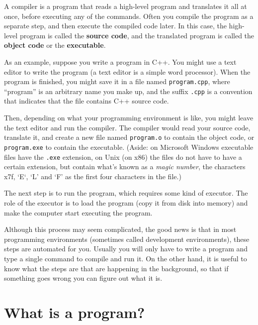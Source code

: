 \vspace{0.1in}
\centerline{}
\vspace{0.1in}

A compiler is a program that reads a high-level program and
translates it all at once, before executing any of the commands.
Often you compile the program as a separate step, and then
execute the compiled code later.  In this case, the high-level
program is called the {\bf source code}, and the translated
program is called the {\bf object code} or the {\bf executable}.

As an example, suppose you write a program in C++.  You might
use a text editor to write the program (a text editor is
a simple word processor).  When the program is finished, you
might save it in a file named {\tt program.cpp}, where ``program''
is an arbitrary name you make up, and the suffix {\tt .cpp} is
a convention that indicates that the file contains C++ source
code.

Then, depending on what your programming environment is like,
you might leave the text editor and run the compiler.  The
compiler would read your source code, translate it, and create
a new file named {\tt program.o} to contain the object code,
or {\tt program.exe} to contain the executable.  (Aside: on Microsoft Windows executable files have the {\tt .exe} extension, on Unix (on x86) the files do not have to have a certain extension, but contain what's known as a {\it magic number}, the characters \\x7f, `E`, `L' and `F' as the first four characters in the file.)  

\vspace{0.1in}
\centerline{}
\vspace{0.1in}

The next step is to run the program, which requires some kind
of executor.  The role of the executor is to load the program
(copy it from disk into memory) and make the computer start
executing the program.

Although this process may seem complicated, the good news is that in
most programming environments (sometimes called development
environments), these steps are automated for you.  Usually you will
only have to write a program and type a single command to compile and
run it.  On the other hand, it is useful to know what the steps are
that are happening in the background, so that if something goes wrong
you can figure out what it is.

\section{What is a program?}

